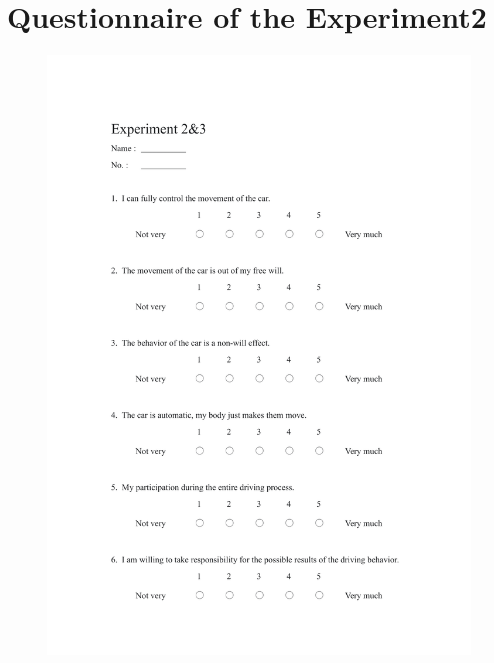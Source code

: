 \section{Questionnaire of the Experiment2}
\begin{figure}[h]
\centering
\includegraphics[width=1\textwidth,height=0.7\textheight]{A_thesis/appendix/Experiment 2 3_questionnaire-1.png}
\end{figure}
\newpage

